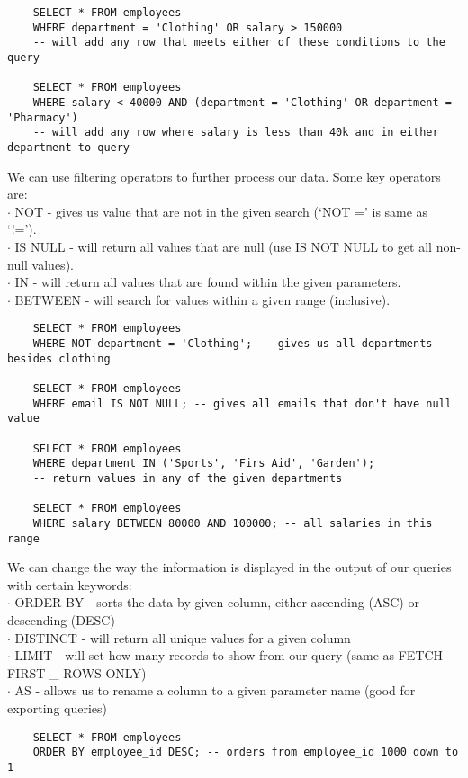 \documentclass[11pt, a4paper]{article}
\begin{document}
\begin{spacing}{1.1}
\begin{lstlisting}
	SELECT * FROM employees
	WHERE department = 'Clothing' OR salary > 150000
	-- will add any row that meets either of these conditions to the query 
	
	SELECT * FROM employees
	WHERE salary < 40000 AND (department = 'Clothing' OR department = 'Pharmacy') 
	-- will add any row where salary is less than 40k and in either department to query \end{lstlisting} \vspace*{1mm}
	We can use filtering operators to further process our data. Some key operators are: \\
	\hspace*{3mm} $\cdot$ NOT - gives us value that are not in the given search (`NOT =' is same as `!='). \\
	\hspace*{3mm} $\cdot$ IS NULL - will return all values that are null (use IS NOT NULL to get all non-null values).\\
	\hspace*{3mm} $\cdot$ IN - will return all values that are found within the given parameters.\\
	\hspace*{3mm} $\cdot$ BETWEEN - will search for values within a given range (inclusive).
	\begin{lstlisting}
	SELECT * FROM employees
	WHERE NOT department = 'Clothing'; -- gives us all departments besides clothing
	
	SELECT * FROM employees
	WHERE email IS NOT NULL; -- gives all emails that don't have null value
	
	SELECT * FROM employees
	WHERE department IN ('Sports', 'Firs Aid', 'Garden'); 
	-- return values in any of the given departments
	
	SELECT * FROM employees
	WHERE salary BETWEEN 80000 AND 100000; -- all salaries in this range \end{lstlisting} \newpage
	\noindent We can change the way the information is displayed in the output of our queries with certain keywords: \\
	\hspace*{3mm} $\cdot$ ORDER BY - sorts the data by given column, either ascending (ASC) or descending (DESC) \\
	\hspace*{3mm} $\cdot$ DISTINCT - will return all unique values for a given column \\
	\hspace*{3mm} $\cdot$ LIMIT - will set how many records to show from our query (same as FETCH FIRST \_ ROWS ONLY)\\
	\hspace*{3mm} $\cdot$ AS - allows us to rename a column to a given parameter name (good for exporting queries)
	\begin{lstlisting}
	SELECT * FROM employees
	ORDER BY employee_id DESC; -- orders from employee_id 1000 down to 1
	

\end{lstlisting}
\end{spacing}
\end{document}
